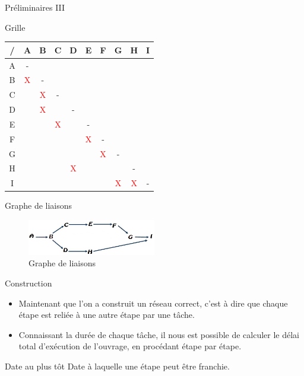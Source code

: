 \documentclass{beamer}
\begin{document}
\begin{frame}{Préliminaires III}
\begin{block}{Grille}
\centering
\begin{tabular}{|c|c|c|c|c|c|c|c|c|c|}
\hline
    / & A & B & C & D & E & F & G & H & I \\
    \hline
    A &-&&&&&&&& \\
    \hline
    B &\textcolor{red}{X}&-&&&&&&&\\
    \hline
    C &&\textcolor{red}{X}&-&&&&&&\\
    \hline
    D &&\textcolor{red}{X}&&-&&&&&\\
    \hline
    E &&&\textcolor{red}{X}&&-&&&&\\
    \hline
    F &&&&&\textcolor{red}{X}&-&&&\\
    \hline
    G &&&&&&\textcolor{red}{X}&-&&\\
    \hline
    H &&&&\textcolor{red}{X}&&&&-&\\
    \hline
    I &&&&&&&\textcolor{red}{X}&\textcolor{red}{X}&-\\
    \hline
\end{tabular}
\end{block}
\end{frame}

\begin{frame}{Graphe de liaisons}
\begin{figure}
      \centering
      \includegraphics[width=0.5\textwidth]{graphe_liaisons}
      \caption{Graphe de liaisons}
\end{figure}
\end{frame}

\begin{frame}{Construction}
    \begin{itemize}
    \item Maintenant que l'on a construit un réseau correct, c'est à dire que chaque étape est reliée à une autre étape par une tâche.
    \item Connaissant la durée de chaque tâche, il nous est possible de calculer le délai total d’exécution de l’ouvrage, en procédant étape par étape.
        \end{itemize}
\begin{block}{Date au plus tôt}
Date à laquelle une étape peut être franchie. 
\end{block}
\end{frame}
\end{document}
